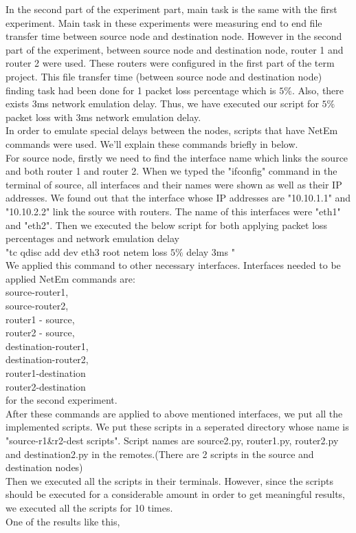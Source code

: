 \documentclass[conference]{IEEEtran}
\begin{document}
In the second part of the experiment part, main task is the same with the first experiment. Main task in these experiments were measuring end to end file transfer time between source node and destination node. However in the second part of the experiment, between source node and destination node, router 1 and router 2  were used. These routers were configured in the first part of the term project. This file transfer time (between source node and destination node) finding task had been done for 1 packet loss percentage which is $5\%$. Also, there exists 3ms network emulation delay. Thus, we have executed our script for $5\%$ packet loss with 3ms network emulation delay.\\
In order to emulate special delays between the nodes, scripts that have NetEm commands were used. We'll explain these commands briefly in below.\\
For source node, firstly we need to find the interface name which links the source and both router 1 and router 2. When we typed the "ifconfig" command in the terminal of source, all interfaces and their names were shown as well as their IP addresses. We found out that the interface whose IP addresses are "10.10.1.1" and "10.10.2.2" link the source with routers. The name of this interfaces were "eth1" and "eth2". Then we executed the below script for both applying packet loss percentages and network emulation delay\\
"tc qdisc add dev eth3 root netem loss $5\%$ delay 3ms "\\
We applied this command to other necessary interfaces. Interfaces needed to be applied NetEm commands are:\\
source-router1,\\
source-router2,\\
router1 - source,\\
router2 - source,\\
destination-router1,\\
destination-router2,\\
router1-destination\\
router2-destination\\
for the second experiment.\\
After these commands are applied to above mentioned interfaces, we put all the implemented scripts. We put these scripts in a seperated directory whose name is "source-r1\&r2-dest scripts". Script names are source2.py, router1.py, router2.py and destination2.py in the remotes.(There are 2 scripts in the source and destination nodes)\\
Then we executed all the scripts in their terminals. However, since the scripts should be executed for a considerable amount in order to get meaningful results, we executed all the scripts for 10 times. \\
One of the results like this,
\end{document}
